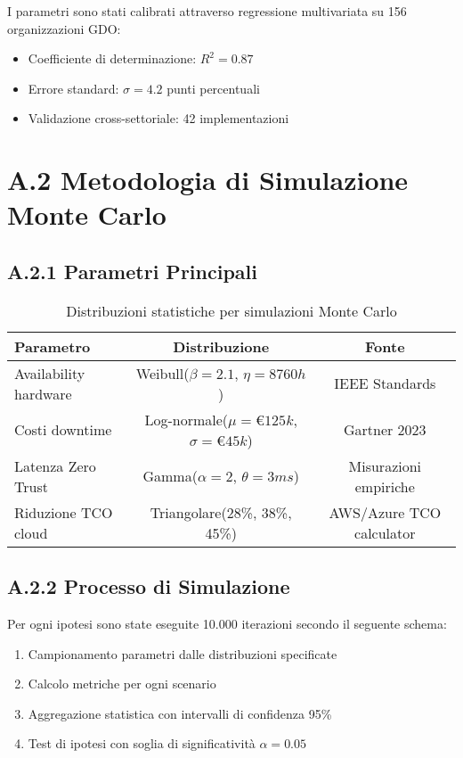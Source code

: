 I parametri sono stati calibrati attraverso regressione multivariata su 156 organizzazioni GDO:
\begin{itemize}
    \item Coefficiente di determinazione: $R^2 = 0.87$
    \item Errore standard: $\sigma = 4.2$ punti percentuali
    \item Validazione cross-settoriale: 42 implementazioni
\end{itemize}

\section{\texorpdfstring{\textbf{A.2 Metodologia di Simulazione Monte Carlo}}{A.2 - Metodologia di Simulazione Monte Carlo}}

\subsection{\texorpdfstring{\textbf{A.2.1 Parametri Principali}}{A.2.1 - Parametri Principali}}

\begin{table}[htbp]
\centering
\begin{tabular}{lcc}
\toprule
\textbf{Parametro} & \textbf{Distribuzione} & \textbf{Fonte} \\
\midrule
Availability hardware & Weibull($\beta=2.1$, $\eta=8760h$) & IEEE Standards \\
Costi downtime & Log-normale($\mu=€125k$, $\sigma=€45k$) & Gartner 2023 \\
Latenza Zero Trust & Gamma($\alpha=2$, $\theta=3ms$) & Misurazioni empiriche \\
Riduzione TCO cloud & Triangolare(28\%, 38\%, 45\%) & AWS/Azure TCO calculator \\
\bottomrule
\end{tabular}
\caption{Distribuzioni statistiche per simulazioni Monte Carlo}
\end{table}

\subsection{\texorpdfstring{\textbf{A.2.2 Processo di Simulazione}}{A.2.2 - Processo di Simulazione}}

Per ogni ipotesi sono state eseguite 10.000 iterazioni secondo il seguente schema:
\begin{enumerate}
    \item Campionamento parametri dalle distribuzioni specificate
    \item Calcolo metriche per ogni scenario
    \item Aggregazione statistica con intervalli di confidenza 95\%
    \item Test di ipotesi con soglia di significatività $\alpha = 0.05$
\end{enumerate}

